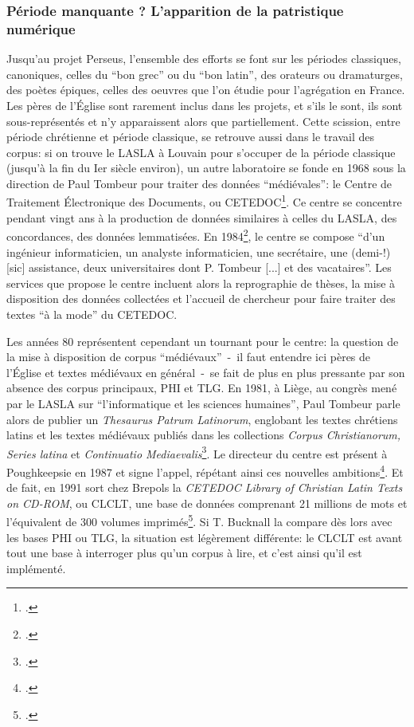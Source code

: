 \subsubsection{Période manquante ? L'apparition de la patristique numérique}

Jusqu'au projet Perseus, l'ensemble des efforts se font sur les périodes classiques, canoniques, celles du \enquote{bon grec} ou du \enquote{bon latin}, des orateurs ou dramaturges, des poètes épiques, celles des oeuvres que l'on étudie pour l'agrégation en France. Les pères de l'Église sont rarement inclus dans les projets, et s'ils le sont, ils sont sous-représentés et n'y apparaissent alors que partiellement. Cette scission, entre période chrétienne et période classique, se retrouve aussi dans le travail des corpus: si on trouve le LASLA à Louvain pour s'occuper de la période classique (jusqu'à la fin du Ier siècle environ), un autre laboratoire se fonde en 1968 sous la direction de Paul Tombeur pour traiter des données \enquote{médiévales}: le Centre de Traitement Électronique des Documents, ou CETEDOC\footcite[p. 70]{gueret_analyse_1977}. Ce centre se concentre pendant vingt ans à la production de données similaires à celles du LASLA, des concordances, des données lemmatisées. En 1984\footcite{iogna-prat_centre_1984}, le centre se compose \enquote{d'un ingénieur informaticien, un analyste informaticien, une secrétaire, une (demi-!) {[sic]} assistance, deux universitaires dont P. Tombeur {[...]} et des vacataires}. Les services que propose le centre incluent alors la reprographie de thèses, la mise à disposition des données collectées et l'accueil de chercheur pour faire traiter des textes \enquote{à la mode} du CETEDOC.

Les années 80 représentent cependant un tournant pour le centre: la question de la mise à disposition de corpus \enquote{médiévaux}~-~il faut entendre ici pères de l'Église et textes médiévaux en général~-~se fait de plus en plus pressante par son absence des corpus principaux, PHI et TLG. En 1981, à Liège, au congrès mené par le LASLA sur \enquote{l'informatique et les sciences humaines}, Paul Tombeur parle alors de publier un \textit{Thesaurus Patrum Latinorum}, englobant les textes chrétiens latins et les textes médiévaux publiés dans les collections \textit{Corpus Christianorum, Series latina} et \textit{Continuatio Mediaevalis}\footcite{tombeur_constitution_1981}. Le directeur du centre est présent à Poughkeepsie en 1987 et signe l'appel, répétant ainsi ces nouvelles ambitions\footcite{burnard_report_1988}. Et de fait, en 1991 sort chez Brepols la \textit{CETEDOC Library of Christian Latin Texts on CD-ROM}, ou CLCLT, une base de données comprenant 21 millions de mots et l'équivalent de 300 volumes imprimés\footcite[p. 90]{bucknall_review_1994}. Si T. Bucknall la compare dès lors avec les bases PHI ou TLG, la situation est légèrement différente: le CLCLT est avant tout une base à interroger plus qu'un corpus à lire, et c'est ainsi qu'il est implémenté.

